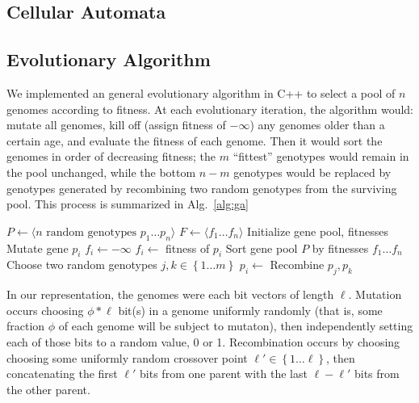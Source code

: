 \documentclass[twocolumn]{article}
\newcommand{\set}[1]{\left\{#1\right\}}
\newcommand{\seq}[1]{\langle #1 \rangle}
\newcommand{\alg}[1]{Alg.~#1}
\begin{document}
\subsection{Cellular Automata}

\subsection{Evolutionary Algorithm}
We implemented an general evolutionary algorithm in C++ to select a pool of $n$ genomes according to fitness.  At each evolutionary iteration, the algorithm would: mutate all genomes, kill off (assign fitness of $-\infty$) any genomes older than a certain age, and evaluate the fitness of each genome. Then it would sort the genomes in order of decreasing fitness; the $m$ ``fittest'' genotypes would remain in the pool unchanged, while the bottom $n-m$ genotypes would be replaced by genotypes generated by recombining two random genotypes from the surviving pool. This process is summarized in \alg{\ref{alg:ga}}

\begin{algorithm}
\label{alg:ga}
\begin{algorithmic}[1]
	\State $P \gets \seq{\text{$n$ random genotypes $p_1 \ldots p_n$}}$
	\State $F \gets \seq{f_1 \ldots f_n}$
	\Statex \Comment Initialize gene pool, fitnesses
	\Repeat
		\ForAll{$i \in \set{1 \ldots n}$}
			\State Mutate gene $p_i$
				\State $f_i \gets -\infty$
			\Else
				\State $f_i \gets$ fitness of $p_i$
			\EndIf
		\EndFor
		\State Sort gene pool $P$ by fitnesses $f_1 \ldots f_n$
		\ForAll{$i \in \set{m \ldots n}$}
			\State Choose two random genotypes 
			\State $j,k \in \set{1 \ldots m}$
			\State $p_i \gets$ Recombine $p_j, p_k$
		\EndFor
	\EndProcedure
\end{algorithmic}
\end{algorithm}

In our representation, the genomes were each bit vectors of length $\ell$. Mutation occurs choosing $\phi*\ell$ bit(s) in a genome uniformly randomly (that is, some fraction $\phi$ of each genome will be subject to mutaton), then independently setting each of those bits to a random value, 0 or 1. Recombination occurs by choosing choosing some uniformly random crossover point $\ell' \in \set{1\ldots\ell}$, then concatenating the first $\ell'$ bits from one parent with the last $\ell-\ell'$ bits from the other parent.  
\end{document}
